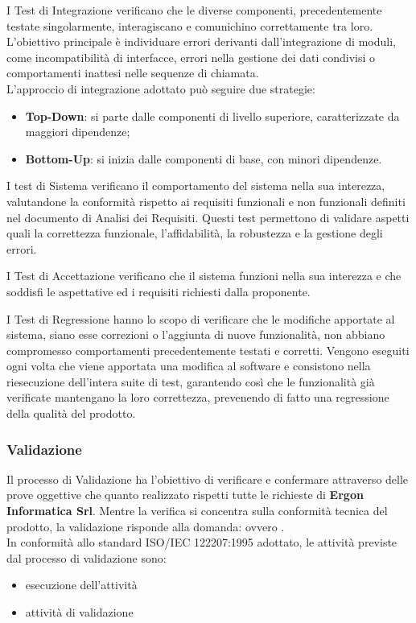 I Test di Integrazione verificano che le diverse componenti, precedentemente testate singolarmente, interagiscano e comunichino correttamente tra loro.\\
L’obiettivo principale è individuare errori derivanti dall’integrazione di moduli, come incompatibilità di interfacce, errori nella gestione dei dati condivisi o comportamenti inattesi nelle sequenze di chiamata.\\
L'approccio di integrazione adottato può seguire due strategie:
\begin{itemize}
    \item \textbf{Top-Down}: si parte dalle componenti di livello superiore, caratterizzate da maggiori dipendenze;
    \item \textbf{Bottom-Up}: si inizia dalle componenti di base, con minori dipendenze.
\end{itemize}

I test di Sistema verificano il comportamento del sistema nella sua interezza, valutandone la conformità rispetto ai requisiti funzionali e non funzionali definiti nel documento di Analisi dei Requisiti. Questi test permettono di validare aspetti quali la correttezza funzionale, l'affidabilità, la robustezza e la gestione degli errori.

I Test di Accettazione verificano che il sistema funzioni nella sua interezza e che soddisfi le aspettative ed i requisiti richiesti dalla proponente.

I Test di Regressione hanno lo scopo di verificare che le modifiche apportate al sistema, siano esse correzioni o l'aggiunta di nuove funzionalità, non abbiano compromesso comportamenti precedentemente testati e corretti. 
Vengono eseguiti ogni volta che viene apportata una modifica al software e consistono nella riesecuzione dell'intera suite di test, garantendo così che le funzionalità già verificate mantengano la loro correttezza, prevenendo di fatto una regressione della qualità del prodotto.

\subsubsection{Validazione}
Il processo di Validazione ha l'obiettivo di verificare e confermare attraverso delle prove oggettive che quanto realizzato rispetti tutte le richieste di \textbf{Ergon Informatica Srl}.
Mentre la verifica si concentra sulla conformità tecnica del prodotto, la validazione risponde alla domanda: \textit{} ovvero \textit{}.\\
In conformità allo standard ISO/IEC 122207:1995 adottato, le attività previste dal processo di validazione sono:
\begin{itemize}
    \item esecuzione dell'attività
    \item attività di validazione
\end{itemize}

